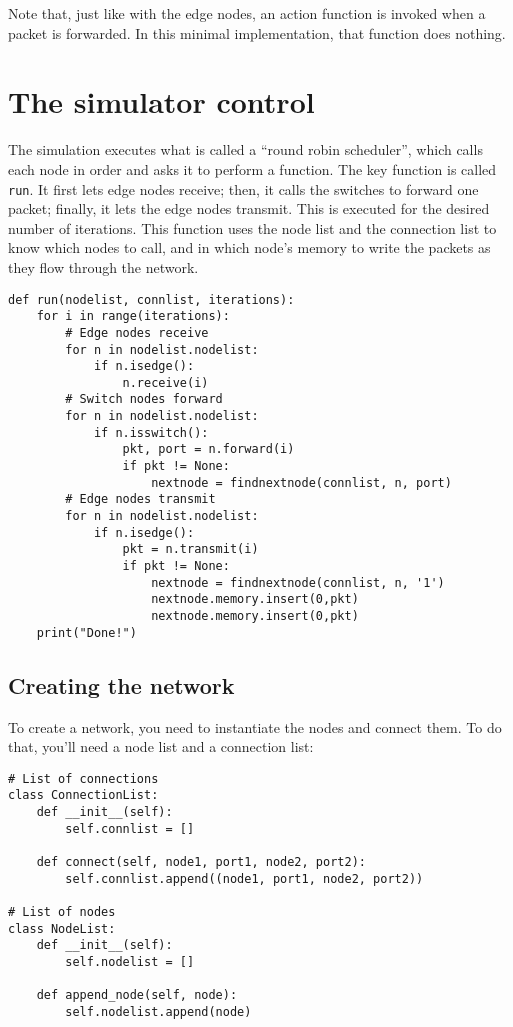 \documentclass[11pt]{report}
\begin{document}
Note that, just like with the edge nodes, an action function is invoked when a
packet is forwarded. In this minimal implementation, that function does
nothing.

\section*{The simulator control}

The simulation executes what is called a ``round robin scheduler'', which calls
each node in order and asks it to perform a function. The key function is
called \texttt{run}. It first lets edge nodes receive; then, it
calls the switches to forward one packet; finally, it lets the edge nodes
transmit. This is executed for the desired number of iterations. This function
uses the node list and the connection list to know which nodes to call, and in
which node's memory to write the packets as they flow through the network.

\begin{verbatim}
def run(nodelist, connlist, iterations):
    for i in range(iterations):
        # Edge nodes receive
        for n in nodelist.nodelist:
            if n.isedge():
                n.receive(i)
        # Switch nodes forward
        for n in nodelist.nodelist:
            if n.isswitch():
                pkt, port = n.forward(i)
                if pkt != None:
                    nextnode = findnextnode(connlist, n, port)
        # Edge nodes transmit
        for n in nodelist.nodelist:
            if n.isedge():
                pkt = n.transmit(i)
                if pkt != None:
                    nextnode = findnextnode(connlist, n, '1')
                    nextnode.memory.insert(0,pkt)
                    nextnode.memory.insert(0,pkt)
    print("Done!")
\end{verbatim}

\subsection*{Creating the network}

To create a network, you need to instantiate the nodes and connect them. To do
that, you'll need a node list and a connection list:

\begin{verbatim}
# List of connections
class ConnectionList:
    def __init__(self):
        self.connlist = []

    def connect(self, node1, port1, node2, port2):
        self.connlist.append((node1, port1, node2, port2))

# List of nodes
class NodeList:
    def __init__(self):
        self.nodelist = []

    def append_node(self, node):
        self.nodelist.append(node)
\end{verbatim}
\end{document}
